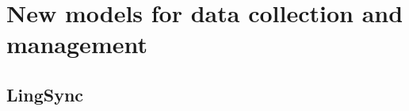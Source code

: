 \documentclass[11pt]{article}
\begin{document}







\section{New models for data collection and management}

\label{sec:lingsync-old}

\subsection{LingSync}\label{sec:lingsync}
\end{document}

